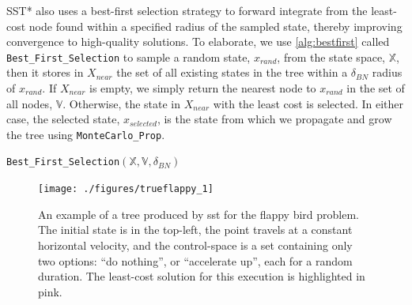 SST* also uses a best-first selection strategy to forward integrate from the least-cost node found within a specified radius of the sampled state, thereby improving convergence to high-quality solutions. To elaborate, we use \autoref{alg:bestfirst} called \texttt{Best\_First\_Selection} to sample a random state, $x_{rand}$, from the state space, $\mathbb{X}$, then it stores in $X_{near}$ the set of all existing states in the tree within a $\delta_{BN}$ radius of $x_{rand}$. If $X_{near}$ is empty, we simply return the nearest node to $x_{rand}$ in the set of all nodes, $\mathbb{V}$. Otherwise, the state in $X_{near}$ with the least cost is selected. In either case, the selected state, $x_{selected}$, is the state from which we propagate and grow the tree using \texttt{MonteCarlo\_Prop}.

\begin{algorithm}
\caption{\texttt{Best\_First\_Selection}$(\mathbb{X}, \mathbb{V}, \delta_{BN})$}
\label{alg:bestfirst}
\begin{algorithmic}[1]
    \Else{}
    \EndIf{}
\end{algorithmic}{}
\end{algorithm}



\begin{figure}
    \centering
    \texttt{[image: ./figures/trueflappy\_1]}
    \caption[SST Flappy Bird Example]{An example of a tree produced by \gls{sst} for the flappy bird problem. The initial state is in the top-left, the point travels at a constant horizontal velocity, and the control-space is a set containing only two options: ``do nothing'', or ``accelerate up'', each for a random duration. The least-cost solution for this execution is highlighted in pink.}
\label{fig:flappy}
\end{figure}

